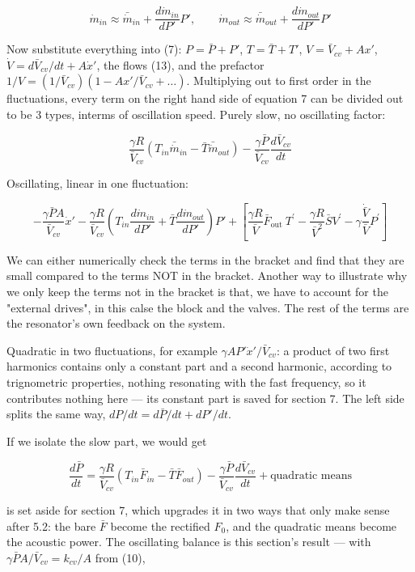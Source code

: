 \documentclass[11pt]{article}
\begin{document}
\begin{equation}
\dot{m}_{in} \approx \bar {\dot{m}}_{in} + \frac{d\dot{m}_{in}}{dP'}P', \qquad \dot{m}_{out} \approx \bar {\dot{m}}_{out} + \frac{d\dot{m}_{out}}{dP'}P' \tag{13}
\end{equation}

Now substitute everything into (7): $P = \bar P + P'$, $T = \bar T + T'$, $V = \bar V_{cv} + Ax'$, $\dot V = d\bar V_{cv}/dt + A\dot x'$, the flows (13), and the prefactor $1/V = (1/\bar V_{cv})(1 - Ax'/\bar V_{cv} + \dots)$. Multiplying out to first order in the fluctuations, every term on the right hand side of equation 7 can be divided out to be 3 types, interms of oscillation speed. Purely slow, no oscillating factor:

\[
\frac{\gamma R}{\bar V_{cv}}\left(T_{in}\bar {\dot{m}}_{in} - \bar T\bar {\dot{m}}_{out}\right) - \frac{\gamma\bar P}{\bar V_{cv}}\frac{d\bar V_{cv}}{dt}
\]

Oscillating, linear in one fluctuation:

\[
-\frac{\gamma\bar PA}{\bar V_{cv}}\dot x' - \frac{\gamma R}{\bar V_{cv}}\left(T_{in}\frac{d\dot{m}_{in}}{dP'} + \bar T\frac{d\dot{m}_{out}}{dP'}\right)P' + [\frac{\gamma R}{\bar{V}} \bar{F}_{\text {out }} T^{\prime}-\frac{\gamma R}{\bar{V}^2} \bar{S} V^{\prime}-\gamma \frac{\dot{\bar{V}}}{\bar{V}} P^{\prime}]
\]

We can either numerically check the terms in the bracket and find that they are small compared to the terms NOT in the bracket. Another way to illustrate why we only keep the terms not in the bracket is that, we have to account for the "external drives", in this calse the block and the valves. The rest of the terms are the resonator's own feedback on the system. 

Quadratic in two fluctuations, for example $\gamma AP'\dot x'/\bar V_{cv}$: a product of two first harmonics contains only a constant part and a second harmonic, according to trignometric properties, nothing resonating with the fast frequency, so it contributes nothing here --- its constant part is saved for section 7. The left side splits the same way, $dP/dt = d\bar P/dt + dP'/dt$.

If we isolate the slow part, we would get

\[
\frac{d\bar P}{dt} = \frac{\gamma R}{\bar V_{cv}}\left(T_{in}\bar F_{in} - \bar T\bar F_{out}\right) - \frac{\gamma\bar P}{\bar V_{cv}}\frac{d\bar V_{cv}}{dt} + \text{quadratic means}
\]

is set aside for section 7, which upgrades it in two ways that only make sense after 5.2: the bare $\bar F$ become the rectified $F_0$, and the quadratic means become the acoustic power. The oscillating balance is this section's result --- with $\gamma\bar PA/\bar V_{cv} = k_{cv}/A$ from (10),
\end{document}
